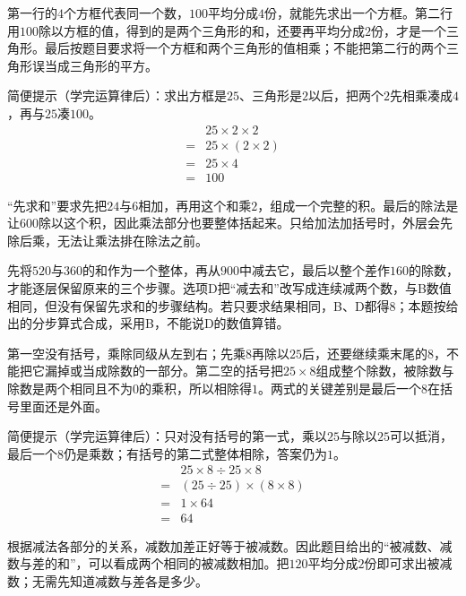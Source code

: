 \documentclass[multi=snippet,border=0pt]{standalone}
\newenvironment{snippet}[3]{\begin{minipage}{#1bp}\color{answerred}\fontsize{#2}{#3}\selectfont\raggedright}{\end{minipage}}
\begin{document}
\begin{snippet}{505}{11.5}{14}第一行的\(4\)个方框代表同一个数，\(100\)平均分成\(4\)份，就能先求出一个方框。第二行用\(100\)除以方框的值，得到的是两个三角形的和，还要再平均分成\(2\)份，才是一个三角形。最后按题目要求将一个方框和两个三角形的值相乘；不能把第二行的两个三角形误当成三角形的平方。\par 简便提示（学完运算律后）：求出方框是\(25\)、三角形是\(2\)以后，把两个\(2\)先相乘凑成\(4\)，再与\(25\)凑\(100\)。\[\begin{aligned}&25\times2\times2\\={}&25\times(2\times2)\\={}&25\times4\\={}&100\end{aligned}\]\end{snippet}
\begin{snippet}{505}{11.5}{14}“先求和”要求先把\(24\)与\(6\)相加，再用这个和乘\(2\)，组成一个完整的积。最后的除法是让\(600\)除以这个积，因此乘法部分也要整体括起来。只给加法加括号时，外层会先除后乘，无法让乘法排在除法之前。\end{snippet}
\begin{snippet}{505}{11.5}{14}先将\(520\)与\(360\)的和作为一个整体，再从\(900\)中减去它，最后以整个差作\(160\)的除数，才能逐层保留原来的三个步骤。选项D把“减去和”改写成连续减两个数，与B数值相同，但没有保留先求和的步骤结构。若只要求结果相同，B、D都得\(8\)；本题按给出的分步算式合成，采用B，不能说D的数值算错。\end{snippet}
\begin{snippet}{505}{11.5}{14}第一空没有括号，乘除同级从左到右；先乘\(8\)再除以\(25\)后，还要继续乘末尾的\(8\)，不能把它漏掉或当成除数的一部分。第二空的括号把\(25\times8\)组成整个除数，被除数与除数是两个相同且不为\(0\)的乘积，所以相除得\(1\)。两式的关键差别是最后一个\(8\)在括号里面还是外面。\par 简便提示（学完运算律后）：只对没有括号的第一式，乘以\(25\)与除以\(25\)可以抵消，最后一个\(8\)仍是乘数；有括号的第二式整体相除，答案仍为\(1\)。\[\begin{aligned}&25\times8\div25\times8\\={}&(25\div25)\times(8\times8)\\={}&1\times64\\={}&64\end{aligned}\]\end{snippet}
\begin{snippet}{505}{11.5}{14}根据减法各部分的关系，减数加差正好等于被减数。因此题目给出的“被减数、减数与差的和”，可以看成两个相同的被减数相加。把\(120\)平均分成\(2\)份即可求出被减数；无需先知道减数与差各是多少。\end{snippet}
\end{document}
